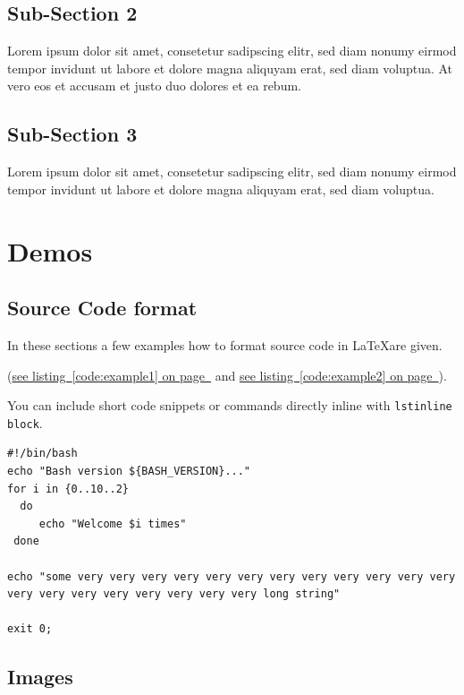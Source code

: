 \documentclass[12pt,a4paper,titlepage,oneside]{scrartcl}
\begin{document}
\subsection{Sub-Section 2}
Lorem ipsum dolor sit amet, consetetur sadipscing elitr, sed diam nonumy eirmod tempor invidunt ut labore et dolore magna aliquyam erat, sed diam voluptua. At vero eos et accusam et justo duo dolores et ea rebum.

\subsection{Sub-Section 3}
Lorem ipsum dolor sit amet, consetetur sadipscing elitr, sed diam nonumy eirmod tempor invidunt ut labore et dolore magna aliquyam erat, sed diam voluptua.

\section{Demos}

\subsection{Source Code format}
In these sections a few examples how to format source code in \LaTeX are given.

(\hyperref[code:example1]{see listing~\ref*{code:example1} on page~\pageref*{code:example1}} and \hyperref[code:example2]{see listing~\ref*{code:example2} on page~\pageref*{code:example2}}).

You can include short code snippets or commands directly inline with \lstinline{lstinline block}.



\begin{lstlisting}[caption=Example bash script,label=code:example2,style=simple]
#!/bin/bash
echo "Bash version ${BASH_VERSION}..."
for i in {0..10..2}
  do
     echo "Welcome $i times"
 done

echo "some very very very very very very very very very very very very very very very very very very very very long string"

exit 0;
\end{lstlisting}

\subsection{Images}
\end{document}
